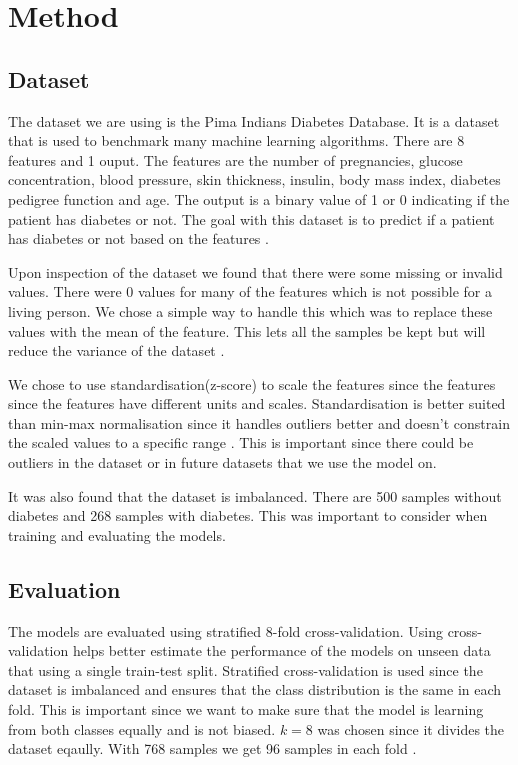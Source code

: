 \section{Method}
\label{sec:method}

\subsection{Dataset}

The dataset we are using is the Pima Indians Diabetes Database. It is a dataset that is used to benchmark many machine learning algorithms. There are 8 features and 1 ouput. The features are the number of pregnancies, glucose concentration, blood pressure, skin thickness, insulin, body mass index, diabetes pedigree function and age. The output is a binary value of 1 or 0 indicating if the patient has diabetes or not. The goal with this dataset is to predict if a patient has diabetes or not based on the features \cite{Kaggle_Pima_Indians}.

Upon inspection of the dataset we found that there were some missing or invalid values. There were 0 values for many of the features which is not possible for a living person. We chose a simple way to handle this which was to replace these values with the mean of the feature. This lets all the samples be kept but will reduce the variance of the dataset \cite{GFG_Missing_Values}.

We chose to use standardisation(z-score) to scale the features since the features since the features have different units and scales. Standardisation is better suited than min-max normalisation since it handles outliers better and doesn't constrain the scaled values to a specific range \cite{GFG_Data_Normalization}. This is important since there could be outliers in the dataset or in future datasets that we use the model on.

It was also found that the dataset is imbalanced. There are 500 samples without diabetes and 268 samples with diabetes. This was important to consider when training and evaluating the models. 

\subsection{Evaluation}

The models are evaluated using stratified 8-fold cross-validation. Using cross-validation helps better estimate the performance of the models on unseen data that using a single train-test split. Stratified cross-validation is used since the dataset is imbalanced and ensures that the class distribution is the same in each fold. This is important since we want to make sure that the model is learning from both classes equally and is not biased. $k=8$ was chosen since it divides the dataset eqaully. With 768 samples we get 96 samples in each fold \cite{Brownlee2023, Krasnoshchek2024, Brownlee2020_imbalanced, Psteen2020}.

